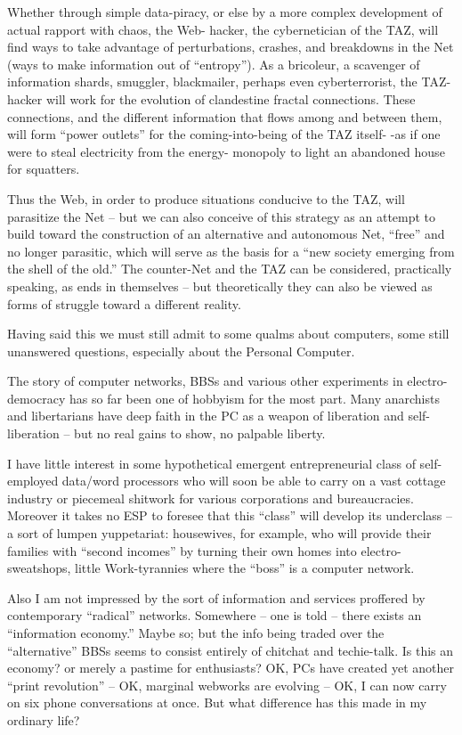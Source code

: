 \documentclass[a4paper,english,10pt,twoside]{article}
\begin{document}
\medskip
Whether through simple data-piracy, or else by a more complex development of actual rapport with chaos, the Web- hacker, the cybernetician of the TAZ, will find ways to take advantage of perturbations, crashes, and breakdowns in the Net (ways to make information out of \enquote{entropy}). As a bricoleur, a scavenger of information shards, smuggler, blackmailer, perhaps even cyberterrorist, the TAZ-hacker will work for the evolution of clandestine fractal connections. These connections, and the different information that flows among and between them, will form \enquote{power outlets} for the coming-into-being of the TAZ itself- -as if one were to steal electricity from the energy- monopoly to light an abandoned house for squatters.

\medskip
Thus the Web, in order to produce situations conducive to the TAZ, will parasitize the Net -- but we can also conceive of this strategy as an attempt to build toward the construction of an alternative and autonomous Net, \enquote{free} and no longer parasitic, which will serve as the basis for a \enquote{new society emerging from the shell of the old.} The counter-Net and the TAZ can be considered, practically speaking, as ends in themselves -- but theoretically they can also be viewed as forms of struggle toward a different reality.

\medskip
Having said this we must still admit to some qualms about computers, some still unanswered questions, especially about the Personal Computer.

\medskip
The story of computer networks, BBSs and various other experiments in electro-democracy has so far been one of hobbyism for the most part. Many anarchists and libertarians have deep faith in the PC as a weapon of liberation and self-liberation -- but no real gains to show, no palpable liberty.

\medskip
I have little interest in some hypothetical emergent entrepreneurial class of self-employed data/word processors who will soon be able to carry on a vast cottage industry or piecemeal shitwork for various corporations and bureaucracies. Moreover it takes no ESP to foresee that this \enquote{class} will develop its underclass -- a sort of lumpen yuppetariat: housewives, for example, who will provide their families with \enquote{second incomes} by turning their own homes into electro-sweatshops, little Work-tyrannies where the \enquote{boss} is a computer network.

\medskip
Also I am not impressed by the sort of information and services proffered by contemporary \enquote{radical} networks. Somewhere -- one is told -- there exists an \enquote{information economy.} Maybe so; but the info being traded over the \enquote{alternative} BBSs seems to consist entirely of chitchat and techie-talk. Is this an economy? or merely a pastime for enthusiasts? OK, PCs have created yet another \enquote{print revolution} -- OK, marginal webworks are evolving -- OK, I can now carry on six phone conversations at once. But what difference has this made in my ordinary life?
\end{document}
